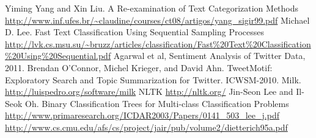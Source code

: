 \documentclass[fontsize=10pt,twocolumn,letterpaper,abstracton]{scrartcl}
\begin{document}
\begin{thebibliography}{1}

 Yiming Yang and Xin Liu. A Re-examination of Text Categorization Methods \url{http://www.inf.ufes.br/~claudine/courses/ct08/artigos/yang_sigir99.pdf}
 Michael D. Lee. Fast Text Classification Using Sequential Sampling Processes \url{http://lvk.cs.msu.su/~bruzz/articles/classification/Fast%20Text%20Classification%20Using%20Sequential.pdf}
 Agarwal et al, Sentiment Analysis of Twitter Data, 2011.
 Brendan O'Connor, Michel Krieger, and David Ahn. TweetMotif: Exploratory Search and Topic Summarization for Twitter. ICWSM-2010.
 Milk. \url{http://luispedro.org/software/milk}
 NLTK \url{http://nltk.org/}
 Jin-Seon Lee and Il-Seok Oh. Binary Classification Trees for Multi-class Classification Problems \url{http://www.primaresearch.org/ICDAR2003/Papers/0141_503_lee_j.pdf}
 \url{http://www.cs.cmu.edu/afs/cs/project/jair/pub/volume2/dietterich95a.pdf}
\end{thebibliography}
\end{document}
